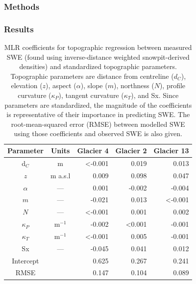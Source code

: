 \documentclass[12pt]{article}
\newcommand{\params}{Topographic parameters are distance from centreline ($d_C$), elevation ($z$), aspect ($\alpha$), slope ($m$), northness ($N$), profile curvature ($\kappa_P$), tangent curvature ($\kappa_T$), and Sx. }
\begin{document}
\subsubsection{Methods}



\subsubsection{Results}

\begin{table}
\centering
\caption{MLR coefficients for topographic regression between measured SWE (found using inverse-distance weighted snowpit-derived densities) and standardized topographic parameters. \params  Since parameters are standardized, the magnitude of the coefficients is representative of their importance in predicting SWE. The root-mean-squared error (RMSE) between modelled SWE using those coefficients and observed SWE is also given.}
\label{tab:MLRcoeff}
\begin{tabular}{ccrrr}
 Parameter & Units & \textbf{Glacier 4} & \textbf{Glacier 2} & \textbf{Glacier 13} \\ \hline
d$_C$ 			&m&  \textless-0.001		& 0.019 					& 0.013 \\
$z$ 				&m a.s.l & 0.009 						& 0.098					& 0.047 \\
$\alpha$ 		& ---& 0.001 						& -0.002 					& -0.004 \\
$m$ 			& ---& -0.021 						& 0.013					 &  \textless-0.001 \\
$N$ 				& ---& \textless-0.001		  	& 0.001 					& 0.002 \\
$\kappa_P$ &m$^{-1}$& -0.002 						& \textless0.001 		& -0.001 \\
$\kappa_T$&m$^{-1}$ & \textless-0.001 		& 0.005 					& -0.001 \\
Sx 			& ---& -0.045 						& 0.041 					&0.012 \\
Intercept 		&& 0.625 						& 0.267 					& 0.241 \\ \hline
RMSE 			&& 0.147						& 0.104 					& 0.089
\end{tabular}
\end{table}
\end{document}
